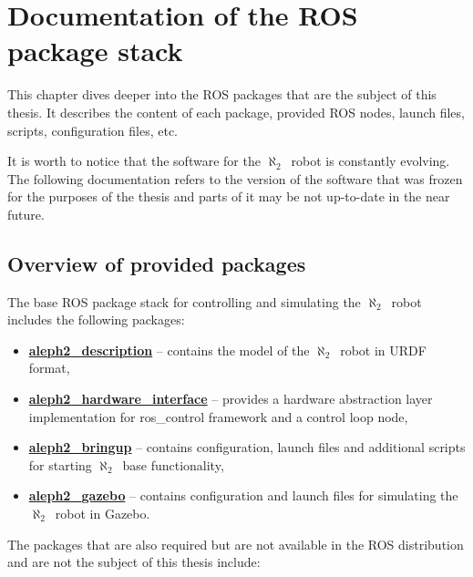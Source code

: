 \documentclass[english,inz,shortabstract]{iithesis}
\newcommand{\rovername}{$\aleph_2$\ }
\begin{document}
\chapter{Documentation of the ROS package stack}

This chapter dives deeper into the ROS packages that are the subject of this thesis. It describes the content of each package, provided ROS nodes, launch files, scripts, configuration files, etc.

It is worth to notice that the software for the \rovername robot is constantly evolving. The following documentation refers to the version of the software that was frozen for the purposes of the thesis and parts of it may be not up-to-date in the near future.

\section{Overview of provided packages}

    The base ROS package stack for controlling and simulating the \rovername robot includes the following packages:

    \begin{itemize}
        \item \href{https://gitlab.continuum.ii.uni.wroc.pl/continuum/software/aleph2_description}{\textbf{aleph2\_description}} -- 
        contains the model of the \rovername robot in URDF format,
        \item \href{https://gitlab.continuum.ii.uni.wroc.pl/continuum/software/aleph2_hardware_interface}{\textbf{aleph2\_hardware\_interface}} -- 
        provides a hardware abstraction layer implementation for ros\_control framework and a control loop node,
        \item \href{https://gitlab.continuum.ii.uni.wroc.pl/continuum/software/aleph2_bringup}{\textbf{aleph2\_bringup}} -- 
        contains configuration, launch files and additional scripts for starting \rovername base functionality,
        \item \href{https://gitlab.continuum.ii.uni.wroc.pl/continuum/software/aleph2_gazebo}{\textbf{aleph2\_gazebo}} -- 
        contains configuration and launch files for simulating the \rovername robot in Gazebo.
    \end{itemize}

    The packages that are also required but are not available in the ROS distribution and are not the subject of this thesis include:
\end{document}
